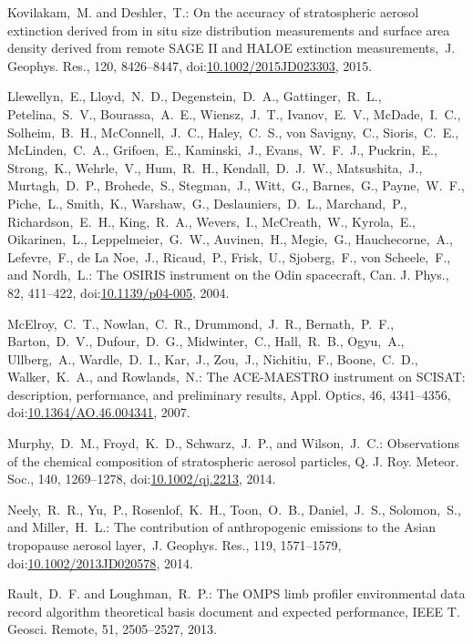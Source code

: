 \documentclass[amtd, online, hvmath]{copernicus}
\begin{document}
\begin{thebibliography}{99}
Kovilakam,~M. and Deshler,~T.: On the accuracy of stratospheric aerosol
extinction derived from in situ size distribution measurements and surface
area density derived from remote SAGE II and HALOE extinction
measurements,~J. Geophys. Res., 120, 8426--8447,
doi:\href{http://dx.doi.org/10.1002/2015JD023303}{10.1002/2015JD023303},
2015.


Llewellyn,~E., Lloyd,~N.~D., Degenstein,~D.~A., Gattinger,~R.~L.,
Petelina,~S.~V., Bourassa,~A.~E., Wiensz,~J.~T., Ivanov,~E.~V.,
McDade,~I.~C., Solheim,~B.~H., McConnell,~J.~C., Haley,~C.~S., von
Savigny,~C., Sioris,~C.~E., McLinden,~C.~A., Grifoen,~E., Kaminski,~J.,
Evans,~W.~F.~J., Puckrin,~E., Strong,~K., Wehrle,~V., Hum,~R.~H.,
Kendall,~D.~J.~W., Matsushita,~J., Murtagh,~D.~P., Brohede,~S., Stegman,~J.,
Witt,~G., Barnes,~G., Payne,~W.~F., Piche,~L., Smith,~K., Warshaw,~G.,
Deslauniers,~D.~L., Marchand,~P., Richardson,~E.~H., King,~R.~A., Wevers,~I.,
McCreath,~W., Kyrola,~E., Oikarinen,~L., Leppelmeier,~G.~W., Auvinen,~H.,
Megie,~G., Hauchecorne,~A., Lefevre,~F., de La Noe,~J., Ricaud,~P.,
Frisk,~U., Sjoberg,~F., von Scheele,~F., and Nordh,~L.: The OSIRIS instrument
on the Odin spacecraft, Can. J. Phys., 82, 411--422,
doi:\href{http://dx.doi.org/10.1139/p04-005}{10.1139/p04-005}, 2004.


McElroy,~C.~T., Nowlan,~C.~R., Drummond,~J.~R., Bernath,~P.~F.,
Barton,~D.~V., Dufour,~D.~G., Midwinter,~C., Hall,~R.~B., Ogyu,~A.,
Ullberg,~A., Wardle,~D.~I., Kar,~J., Zou,~J., Nichitiu,~F., Boone,~C.~D.,
Walker,~K.~A., and Rowlands,~N.: The ACE-MAESTRO instrument on SCISAT:
description, performance, and preliminary results, Appl. Optics, 46,
4341--4356,
doi:\href{http://dx.doi.org/10.1364/AO.46.004341}{10.1364/AO.46.004341},
2007.


Murphy,~D.~M., Froyd,~K.~D., Schwarz,~J.~P., and Wilson,~J.~C.: Observations
of the chemical composition of stratospheric aerosol particles, Q. J. Roy.
Meteor. Soc., 140, 1269--1278,
doi:\href{http://dx.doi.org/10.1002/qj.2213}{10.1002/qj.2213}, 2014.


Neely,~R.~R., Yu,~P., Rosenlof,~K.~H., Toon,~O.~B., Daniel,~J.~S.,
Solomon,~S., and Miller,~H.~L.: The contribution of anthropogenic 
emissions to the Asian tropopause aerosol layer,~J. Geophys. Res., 119,
1571--1579,
doi:\href{http://dx.doi.org/10.1002/2013JD020578}{10.1002/2013JD020578},
2014.


Rault,~D.~F. and Loughman,~R.~P.: The OMPS limb profiler environmental data
record algorithm theoretical basis document and expected performance, IEEE T.
Geosci. Remote, 51, 2505--2527, 2013.



\end{thebibliography}
\end{document}
